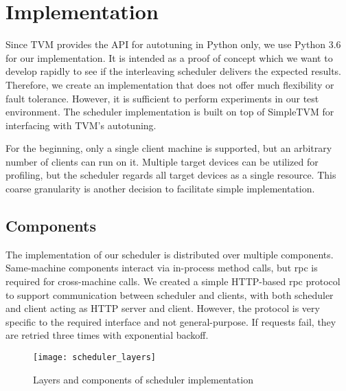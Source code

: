 \section{Implementation}
Since TVM provides the API for autotuning in Python only, we use Python 3.6 for our implementation. It is intended as a proof of concept which we want to develop rapidly to see if the interleaving scheduler delivers the expected results. Therefore, we create an implementation that does not offer much flexibility or fault tolerance. However, it is sufficient to perform experiments in our test environment. The scheduler implementation is built on top of SimpleTVM for interfacing with TVM's autotuning.

For the beginning, only a single client machine is supported, but an arbitrary number of clients can run on it. Multiple target devices can be utilized for profiling, but the scheduler regards all target devices as a single resource. This coarse granularity is another decision to facilitate simple implementation.

\subsection{Components}
The implementation of our scheduler is distributed over multiple components. Same-machine components interact via in-process method calls, but \gls{rpc} is required for cross-machine calls. We created a simple HTTP-based \gls{rpc} protocol to support communication between scheduler and clients, with both scheduler and client acting as HTTP server and client. However, the protocol is very specific to the required interface and not general-purpose. If requests fail, they are retried three times with exponential backoff.

\begin{figure}[h]
	\centering
	\texttt{[image: scheduler\_layers]}%
	\caption{Layers and components of scheduler implementation}
	\label{fig:scheduler-layers}
\end{figure}


